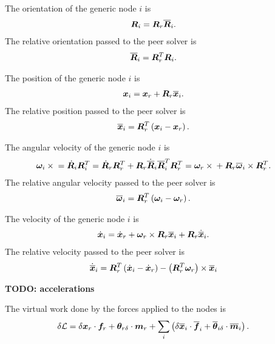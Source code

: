 The orientation of the generic node $i$ is
\begin{align}
	\bm{R}_i
	&=
	\bm{R}_r \overline{\bm{R}}_i
	.
\end{align}
The relative orientation passed to the peer solver is
\begin{align}
	\overline{\bm{R}}_i
	&=
	\bm{R}_r^T \bm{R}_i
	.
\end{align}

The position of the generic node $i$ is
\begin{align}
	\bm{x}_i
	&=
	\bm{x}_r
	+
	\bm{R}_r \overline{\bm{x}}_i
	.
\end{align}
The relative position passed to the peer solver is
\begin{align}
	\overline{\bm{x}}_i
	&=
	\bm{R}_r^T \left( \bm{x}_i - \bm{x}_r \right)
	.
\end{align}

The angular velocity of the generic node $i$ is
\begin{align}
	\bm{\omega}_i\times{}
	&=
	\dot{\bm{R}}_i \bm{R}_i^T
	=
	\dot{\bm{R}}_r \bm{R}_r^T
	+
	\bm{R}_r \dot{\overline{\bm{R}}}_i \overline{\bm{R}}_i^T \bm{R}_r^T
	=
	\bm{\omega}_r\times{}
	+
	\bm{R}_r \overline{\bm{\omega}}_i\times \bm{R}_r^T
	.
\end{align}
The relative angular velocity passed to the peer solver is
\begin{align}
	\overline{\bm{\omega}}_i
	&=
	\bm{R}_r^T \left( \bm{\omega}_i - \bm{\omega}_r \right)
	.
\end{align}


The velocity of the generic node $i$ is
\begin{align}
	\dot{\bm{x}}_i
	&=
	\dot{\bm{x}}_r
	+
	\bm{\omega}_r \times \bm{R}_r \overline{\bm{x}}_i
	+
	\bm{R}_r \dot{\overline{\bm{x}}}_i
	.
\end{align}
The relative velocity passed to the peer solver is
\begin{align}
	\dot{\overline{\bm{x}}}_i
	&=
	\bm{R}_r^T \left( 
		\dot{\bm{x}}_i
		-
		\dot{\bm{x}}_r
	 \right)
	-
	\left( \bm{R}_r^T \bm{\omega}_r \right) \times \overline{\bm{x}}_i
\end{align}

\textbf{TODO: accelerations}

The virtual work done by the forces applied to the nodes is
\begin{align}
	\delta\mathcal{L}
	&=
	\delta\bm{x}_r \cdot \bm{f}_r
	+
	\bm{\theta}_{r\delta} \cdot \bm{m}_r
	+
	\sum_i \left( 
		\delta\overline{\bm{x}}_i \cdot \overline{\bm{f}}_i
		+
		\overline{\bm{\theta}}_{i\delta} \cdot \overline{\bm{m}}_i
	 \right)
	.
\end{align}

